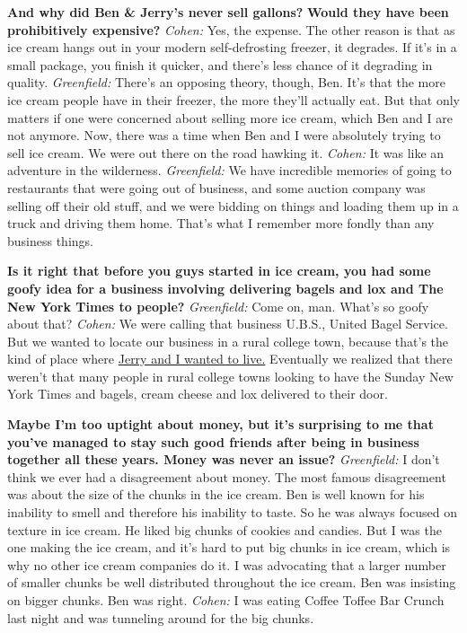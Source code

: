 \textbf{And why did Ben \& Jerry's never sell gallons?} \textbf{Would
they have been prohibitively expensive?} \emph{Cohen:} Yes, the expense.
The other reason is that as ice cream hangs out in your modern
self-defrosting freezer, it degrades. If it's in a small package, you
finish it quicker, and there's less chance of it degrading in quality.
\emph{Greenfield:} There's an opposing theory, though, Ben. It's that
the more ice cream people have in their freezer, the more they'll
actually eat. But that only matters if one were concerned about selling
more ice cream, which Ben and I are not anymore. Now, there was a time
when Ben and I were absolutely trying to sell ice cream. We were out
there on the road hawking it. \emph{Cohen:} It was like an adventure in
the wilderness. \emph{Greenfield:} We have incredible memories of going
to restaurants that were going out of business, and some auction company
was selling off their old stuff, and we were bidding on things and
loading them up in a truck and driving them home. That's what I remember
more fondly than any business things.

\textbf{Is it right that before you guys started in ice cream, you had
some goofy idea for a business involving delivering bagels and lox and
The New York Times to people?} \emph{Greenfield:} Come on, man. What's
so goofy about that? \emph{Cohen:} We were calling that business U.B.S.,
United Bagel Service. But we wanted to locate our business in a rural
college town, because that's the kind of place where
\href{http://nytimes.com\#tooltip-8}{Jerry and I wanted to live.}
Eventually we realized that there weren't that many people in rural
college towns looking to have the Sunday New York Times and bagels,
cream cheese and lox delivered to their door.

\textbf{Maybe I'm too uptight about money, but it's surprising to me
that you've managed to stay such good friends after being in business
together all these years. Money was never an issue?} \emph{Greenfield:}
I don't think we ever had a disagreement about money. The most famous
disagreement was about the size of the chunks in the ice cream. Ben is
well known for his inability to smell and therefore his inability to
taste. So he was always focused on texture in ice cream. He liked big
chunks of cookies and candies. But I was the one making the ice cream,
and it's hard to put big chunks in ice cream, which is why no other ice
cream companies do it. I was advocating that a larger number of smaller
chunks be well distributed throughout the ice cream. Ben was insisting
on bigger chunks. Ben was right. \emph{Cohen:} I was eating Coffee
Toffee Bar Crunch last night and was tunneling around for the big
chunks.

